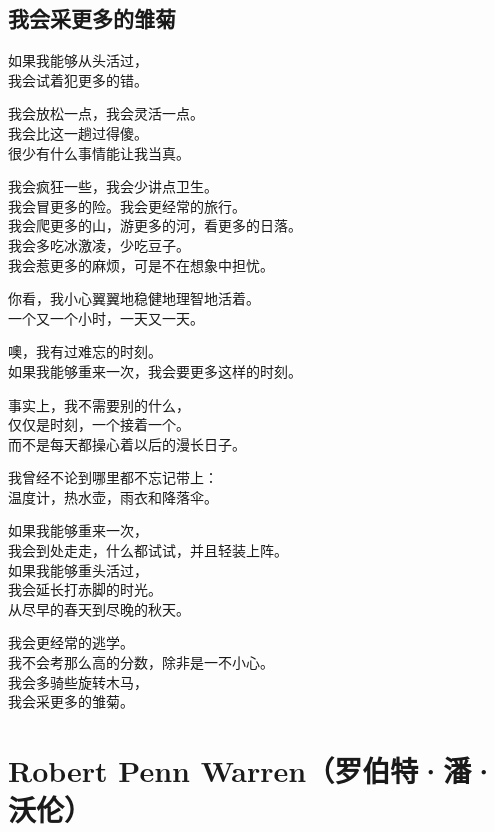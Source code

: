 \documentclass[
]{book}
\renewenvironment{quote}{\begin{VF}}{\end{VF}}
\begin{document}
\hypertarget{section-64}{%
\section{我会采更多的雏菊}\label{section-64}}

\begin{quote}
如果我能够从头活过，\\
我会试着犯更多的错。

我会放松一点，我会灵活一点。\\
我会比这一趟过得傻。\\
很少有什么事情能让我当真。

我会疯狂一些，我会少讲点卫生。\\
我会冒更多的险。我会更经常的旅行。\\
我会爬更多的山，游更多的河，看更多的日落。\\
我会多吃冰激凌，少吃豆子。\\
我会惹更多的麻烦，可是不在想象中担忧。

你看，我小心翼翼地稳健地理智地活着。\\
一个又一个小时，一天又一天。

噢，我有过难忘的时刻。\\
如果我能够重来一次，我会要更多这样的时刻。

事实上，我不需要别的什么，\\
仅仅是时刻，一个接着一个。\\
而不是每天都操心着以后的漫长日子。

我曾经不论到哪里都不忘记带上：\\
温度计，热水壶，雨衣和降落伞。

如果我能够重来一次，\\
我会到处走走，什么都试试，并且轻装上阵。\\
如果我能够重头活过，\\
我会延长打赤脚的时光。\\
从尽早的春天到尽晚的秋天。

我会更经常的逃学。\\
我不会考那么高的分数，除非是一不小心。\\
我会多骑些旋转木马，\\
我会采更多的雏菊。
\end{quote}

\hypertarget{robert-penn-warren}{%
\chapter{Robert Penn Warren（罗伯特·潘·沃伦）}\label{robert-penn-warren}}
\end{document}
